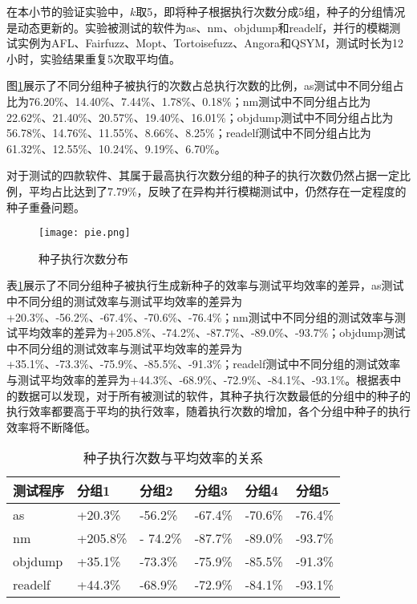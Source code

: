 \documentclass[master]{thesis-uestc}
\begin{document}
在本小节的验证实验中，$k$取5，即将种子根据执行次数分成5组，种子的分组情况是动态更新的。实验被测试的软件为as、nm、objdump和readelf，并行的模糊测试实例为AFL、Fairfuzz、Mopt、Tortoisefuzz、Angora和QSYM，测试时长为12小时，实验结果重复5次取平均值。

图\ref{fenbu}展示了不同分组种子被执行的次数占总执行次数的比例，as测试中不同分组占比为76.20\%、14.40\%、7.44\%、1.78\%、0.18\%；nm测试中不同分组占比为22.62\%、21.40\%、20.57\%、19.40\%、16.01\%；objdump测试中不同分组占比为56.78\%、14.76\%、11.55\%、8.66\%、8.25\%；readelf测试中不同分组占比为61.32\%、12.55\%、10.24\%、9.19\%、6.70\%。

对于测试的四款软件、其属于最高执行次数分组的种子的执行次数仍然占据一定比例，平均占比达到了7.79\%，反映了在异构并行模糊测试中，仍然存在一定程度的种子重叠问题。


\begin{figure}[t]
    \vspace{6pt}
    \centering
    \texttt{[image: pie.png]}
    \caption{种子执行次数分布}
    \label{fenbu}
\end{figure}

表\ref{table_eff}展示了不同分组种子被执行生成新种子的效率与测试平均效率的差异，as测试中不同分组的测试效率与测试平均效率的差异为+20.3\%、-56.2\%、-67.4\%、-70.6\%、-76.4\%；nm测试中不同分组的测试效率与测试平均效率的差异为+205.8\%、-74.2\%、-87.7\%、-89.0\%、-93.7\%；objdump测试中不同分组的测试效率与测试平均效率的差异为+35.1\%、-73.3\%、-75.9\%、-85.5\%、-91.3\%；readelf测试中不同分组的测试效率与测试平均效率的差异为+44.3\%、-68.9\%、-72.9\%、-84.1\%、-93.1\%。根据表中的数据可以发现，对于所有被测试的软件，其种子执行次数最低的分组中的种子的执行效率都要高于平均的执行效率，随着执行次数的增加，各个分组中种子的执行效率将不断降低。

\begin{table}[!htbp]
    \caption{种子执行次数与平均效率的关系}
    \begin{tabular}{llllll}
    \toprule
    测试程序 & 分组1 & 分组2 & 分组3 & 分组4 & 分组5 \\
    \midrule
    as & +20.3\% & -56.2\% & -67.4\% & -70.6\% & -76.4\%  \\
    nm & +205.8\% &- 74.2\% & -87.7\% & -89.0\% & -93.7\%    \\
    objdump & +35.1\% & -73.3\% & -75.9\% & -85.5\% & -91.3\% \\
    readelf & +44.3\% & -68.9\% & -72.9\% & -84.1\% & -93.1\% \\
    \bottomrule
    \end{tabular}
    \label{table_eff}
    \vspace{6pt}
\end{table}
\end{document}
